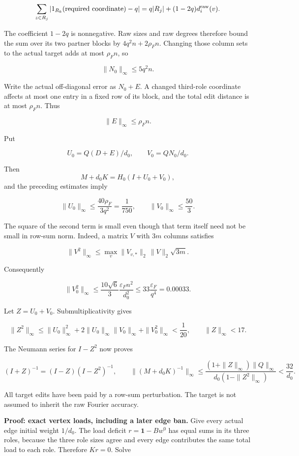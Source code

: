 \documentclass[11pt,a4paper]{article}
\newcommand{\labelledparagraphstart}{\par\addvspace{3pt plus 1pt minus 1pt}\noindent}
\begin{document}
\[
\sum_{z\in R_j}
  |1_{R_k}(\text{required coordinate})-q|
=q|R_j|+(1-2q)d_i^{\rm raw}(v).
\]

The coefficient \(1-2q\) is nonnegative. Raw sizes and raw degrees therefore bound the sum over its two partner blocks by \(4q^2n+2\rho_F n\). Changing those column sets to the actual target adds at most \(\rho_F n\), so

\[
\|N_0\|_\infty\le5q^2n.
\]

Write the actual off-diagonal error as \(N_0+E\). A changed third-role coordinate affects at most one entry in a fixed row of its block, and the total edit distance is at most \(\rho_F n\). Thus

\[
\|E\|_\infty\le\rho_F n.
\]

Put

\[
U_0=Q(D+E)/d_0,\qquad V_0=QN_0/d_0.
\]

Then \[
M+d_0K=H_0(I+U_0+V_0),
\] and the preceding estimates imply

\[
\|U_0\|_\infty\le\frac{40\rho_F}{3q^2}
=\frac1{750},\qquad
\|V_0\|_\infty\le\frac{50}{3}.
\]

The square of the second term is small even though that term itself need not be small in row-sum norm. Indeed, a matrix \(V\) with \(3m\) columns satisfies

\[
\|V^2\|_\infty
\le\max_v\|V_{v,*}\|_2\,\|V\|_2\sqrt{3m}.
\]

Consequently

\[
\|V_0^2\|_\infty
\le\frac{10\sqrt6}{3}
\frac{\varepsilon_F n^2}{d_0^2}
\le33\frac{\varepsilon_F}{q^4}=0.00033.
\]

Let \(Z=U_0+V_0\). Submultiplicativity gives

\[
\|Z^2\|_\infty
\le\|U_0\|_\infty^2
+2\|U_0\|_\infty\|V_0\|_\infty
+\|V_0^2\|_\infty<\frac1{20},
\qquad \|Z\|_\infty<17.
\]

The Neumann series for \(I-Z^2\) now proves

\[
(I+Z)^{-1}=(I-Z)(I-Z^2)^{-1},\qquad
\|(M+d_0K)^{-1}\|_\infty
\le\frac{(1+\|Z\|_\infty)\|Q\|_\infty}
{d_0(1-\|Z^2\|_\infty)}<\frac{32}{d_0}.
\]

All target edits have been paid by a row-sum perturbation. The target is not assumed to inherit the raw Fourier accuracy.

\labelledparagraphstart\textbf{Proof: exact vertex loads, including a later edge ban.} Give every actual edge initial weight \(1/d_0\). The load deficit \(r=\mathbf1-Bw^0\) has equal sums in its three roles, because the three role sizes agree and every edge contributes the same total load to each role. Therefore \(Kr=0\). Solve
\end{document}
